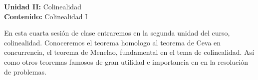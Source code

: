 {\Large
    \textbf{Unidad II:} Colinealidad\vspace{2mm}\\
    \textbf{Contenido:} Colinealidad I
}

En esta cuarta sesión de clase entraremos en la segunda unidad del curso, colinealidad.
Conoceremos el teorema homologo al teorema de Ceva en concurrencia, el teorema de Menelao, fundamental en el tema de colinealidad.
Así como otros teoremas famosos de gran utilidad e importancia en en la resolución de problemas.